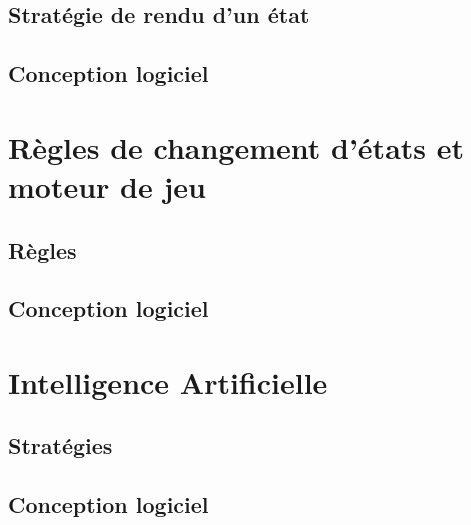 \documentclass[a4paper,12pt]{article}
\begin{document}
    \subsection{Stratégie de rendu d'un état}


    \subsection{Conception logiciel}


    \clearpage
    \section{Règles de changement d'états et moteur de jeu}

    \subsection{Règles}

    \clearpage
    \subsection{Conception logiciel}




    \section{Intelligence Artificielle}

    \subsection{Stratégies}

    \clearpage
    \subsection{Conception logiciel}
\end{document}
